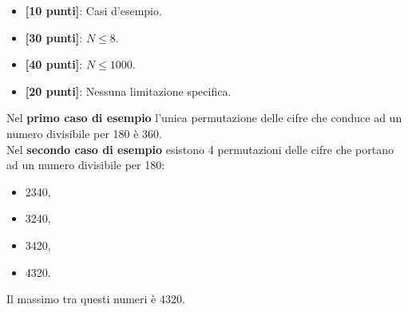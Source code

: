 \begin{itemize}[nolistsep,itemsep=2mm]
  \item \textbf{ [10 punti]}: Casi d'esempio.
  \item \textbf{ [30 punti]}: $N \leq 8$.
  \item \textbf{ [40 punti]}: $N \leq 1000$.
  \item \textbf{ [20 punti]}: Nessuna limitazione specifica.
\end{itemize}

\Examples
\begin{example}
%
\end{example}
\begin{example}
%
\end{example}


\Explanation
Nel \textbf{primo caso di esempio} l'unica permutazione delle cifre che conduce ad un numero divisibile per 180 è 360.\\[2mm]
Nel \textbf{secondo caso di esempio} esistono 4 permutazioni delle cifre che portano ad un numero divisibile per 180:
\begin{itemize}[nolistsep, itemsep=2mm]
	\item 2340,
	\item 3240,
	\item 3420,
	\item 4320.
\end{itemize}
Il massimo tra questi numeri è 4320.